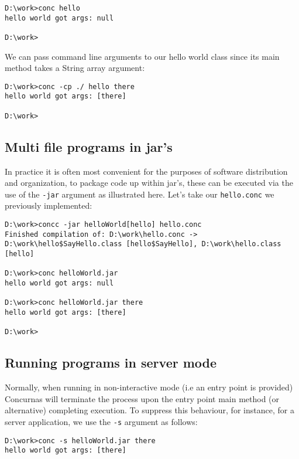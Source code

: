 \documentclass[conc-doc]{subfiles}
\begin{document}
\begin{lstlisting}[language=None]
D:\work>conc hello
hello world got args: null

D:\work>
\end{lstlisting}

We can pass command line arguments to our hello world class since its main method takes a String array argument:
\begin{lstlisting}[language=None]
D:\work>conc -cp ./ hello there
hello world got args: [there]

D:\work>
\end{lstlisting}


\subsection{Multi file programs in jar's}
In practice it is often most convenient for the purposes of software distribution and organization, to package code up within jar's, these can be executed via the use of the \lstinline[language=None]{-jar} argument as illustrated here. Let's take our \lstinline[language=None]{hello.conc} we previously implemented:

\begin{lstlisting}[language=None]
D:\work>concc -jar helloWorld[hello] hello.conc
Finished compilation of: D:\work\hello.conc -> D:\work\hello$SayHello.class [hello$SayHello], D:\work\hello.class [hello]

D:\work>conc helloWorld.jar
hello world got args: null

D:\work>conc helloWorld.jar there
hello world got args: [there]

D:\work>
\end{lstlisting}


\subsection{Running programs in server mode}
Normally, when running in non-interactive mode (i.e an entry point is provided) Concurnas will terminate the process upon the entry point main method (or alternative) completing execution. To suppress this behaviour, for instance, for a server application, we use the  \lstinline[language=None]{-s} argument as follows:

\begin{lstlisting}[language=None]
D:\work>conc -s helloWorld.jar there
hello world got args: [there]


\end{lstlisting}
\end{document}
